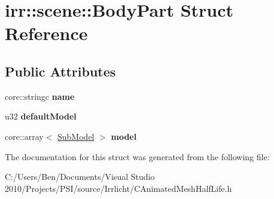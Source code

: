 \hypertarget{structirr_1_1scene_1_1_body_part}{\section{irr\-:\-:scene\-:\-:Body\-Part Struct Reference}
\label{structirr_1_1scene_1_1_body_part}
}
\subsection*{Public Attributes}
\begin{DoxyCompactItemize}
\item 
\hypertarget{structirr_1_1scene_1_1_body_part_ad16941c3d4d98c0f75ac38c3e2051a52}{core\-::stringc {\bfseries name}}\label{structirr_1_1scene_1_1_body_part_ad16941c3d4d98c0f75ac38c3e2051a52}

\item 
\hypertarget{structirr_1_1scene_1_1_body_part_ab736a451a71c82c060c7332fb5ba6544}{u32 {\bfseries default\-Model}}\label{structirr_1_1scene_1_1_body_part_ab736a451a71c82c060c7332fb5ba6544}

\item 
\hypertarget{structirr_1_1scene_1_1_body_part_aa82997073a38ccccb40aa7b40835e794}{core\-::array$<$ \hyperlink{structirr_1_1scene_1_1_sub_model}{Sub\-Model} $>$ {\bfseries model}}\label{structirr_1_1scene_1_1_body_part_aa82997073a38ccccb40aa7b40835e794}

\end{DoxyCompactItemize}


The documentation for this struct was generated from the following file\-:\begin{DoxyCompactItemize}
\item 
C\-:/\-Users/\-Ben/\-Documents/\-Visual Studio 2010/\-Projects/\-P\-S\-I/source/\-Irrlicht/C\-Animated\-Mesh\-Half\-Life.\-h\end{DoxyCompactItemize}
